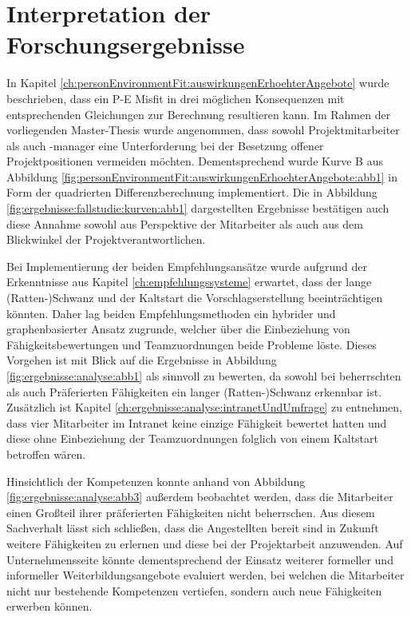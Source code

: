 \section{Interpretation der Forschungsergebnisse}
\label{ch:diskussion:interpretation}
In Kapitel \ref{ch:personEnvironmentFit:auswirkungenErhoehterAngebote} wurde beschrieben, dass ein P-E Misfit in drei möglichen Konsequenzen mit entsprechenden Gleichungen zur Berechnung resultieren kann. Im Rahmen der vorliegenden Master-Thesis wurde angenommen, dass sowohl Projektmitarbeiter als auch -manager eine Unterforderung bei der Besetzung offener Projektpositionen vermeiden möchten. Dementsprechend wurde Kurve B aus Abbildung \ref{fig:personEnvironmentFit:auswirkungenErhoehterAngebote:abb1} in Form der quadrierten Differenzberechnung implementiert. Die in Abbildung \ref{fig:ergebnisse:fallstudie:kurven:abb1} dargestellten Ergebnisse bestätigen auch diese Annahme sowohl aus Perspektive der Mitarbeiter als auch aus dem Blickwinkel der Projektverantwortlichen. 

Bei Implementierung der beiden Empfehlungsansätze wurde aufgrund der Erkenntnisse aus Kapitel \ref{ch:empfehlungssysteme} erwartet, dass der lange (Ratten-)Schwanz und der Kaltstart die Vorschlagserstellung beeinträchtigen könnten. Daher lag beiden Empfehlungsmethoden ein hybrider und graphenbasierter Ansatz zugrunde, welcher über die Einbeziehung von Fähigkeitsbewertungen und Teamzuordnungen beide Probleme löste. Dieses Vorgehen ist mit Blick auf die Ergebnisse in Abbildung \ref{fig:ergebnisse:analyse:abb1} als sinnvoll zu bewerten, da sowohl bei beherrschten als auch Präferierten Fähigkeiten ein langer (Ratten-)Schwanz erkennbar ist. Zusätzlich ist Kapitel \ref{ch:ergebnisse:analyse:intranetUndUmfrage} zu entnehmen, dass vier Mitarbeiter im Intranet keine einzige Fähigkeit bewertet hatten und diese ohne Einbeziehung der Teamzuordnungen folglich von einem Kaltstart betroffen wären.

Hinsichtlich der Kompetenzen konnte anhand von Abbildung \ref{fig:ergebnisse:analyse:abb3} außerdem beobachtet werden, dass die Mitarbeiter einen Großteil ihrer präferierten Fähigkeiten nicht beherrschen. Aus diesem Sachverhalt lässt sich schließen, dass die Angestellten bereit sind in Zukunft weitere Fähigkeiten zu erlernen und diese bei der Projektarbeit anzuwenden. Auf Unternehmensseite könnte dementsprechend der Einsatz weiterer formeller und informeller Weiterbildungsangebote evaluiert werden, bei welchen die Mitarbeiter nicht nur bestehende Kompetenzen vertiefen, sondern auch neue Fähigkeiten erwerben können.

